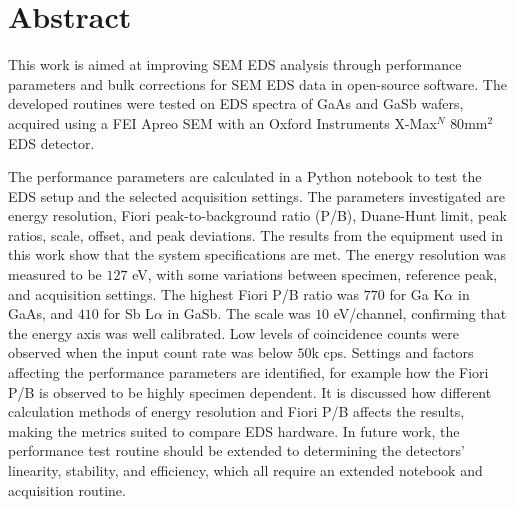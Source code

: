\chapter*{Abstract}

\label{ch:abstract}

This work is aimed at improving SEM EDS analysis through performance parameters and bulk corrections for SEM EDS data in open-source software.
The developed routines were tested on EDS spectra of GaAs and GaSb wafers, acquired using a FEI Apreo SEM with an Oxford Instruments X-Max$^N$ $80$mm$^2$ EDS detector.

The performance parameters are calculated in a Python notebook to test the EDS setup and the selected acquisition settings.
The parameters investigated are energy resolution, Fiori peak-to-background ratio (P/B), Duane-Hunt limit, peak ratios, scale, offset, and peak deviations.
The results from the equipment used in this work show that the system specifications are met.
The energy resolution was measured to be $127$ eV, with some variations between specimen, reference peak, and acquisition settings.
The highest Fiori P/B ratio was $770$ for Ga K$\alpha$ in GaAs, and $410$ for Sb L$\alpha$ in GaSb.
The scale was $10$ eV/channel, confirming that the energy axis was well calibrated.
Low levels of coincidence counts were observed when the input count rate was below $50$k cps.
Settings and factors affecting the performance parameters are identified, for example how the Fiori P/B is observed to be highly specimen dependent.
It is discussed how different calculation methods of energy resolution and Fiori P/B affects the results, making the metrics suited to compare EDS hardware.
In future work, the performance test routine should be extended to determining the detectors' linearity, stability, and efficiency, which all require an extended notebook and acquisition routine.


